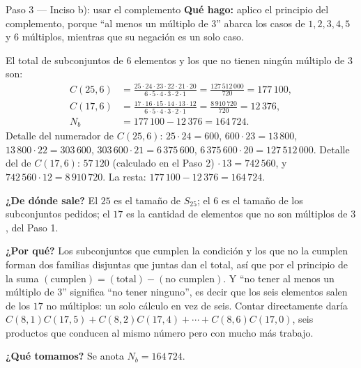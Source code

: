 \documentclass[11pt]{article}
\begin{document}
\begin{paso}{Paso 3 --- Inciso b): usar el complemento}
\textbf{Qué hago:} aplico el principio del complemento, porque ``al menos un múltiplo de 3'' abarca los casos de $1,2,3,4,5$ y $6$ múltiplos, mientras que su negación es un solo caso.

El total de subconjuntos de $6$ elementos y los que no tienen ningún múltiplo de $3$ son:
\begin{align*}
  C(25,6)&=\frac{25\cdot 24\cdot 23\cdot 22\cdot 21\cdot 20}{6\cdot 5\cdot 4\cdot 3\cdot 2\cdot 1}=\frac{127\,512\,000}{720}=177\,100,\\
  C(17,6)&=\frac{17\cdot 16\cdot 15\cdot 14\cdot 13\cdot 12}{6\cdot 5\cdot 4\cdot 3\cdot 2\cdot 1}=\frac{8\,910\,720}{720}=12\,376,\\
  N_b&=177\,100-12\,376=164\,724 .
\end{align*}
Detalle del numerador de $C(25,6)$: $25\cdot 24=600$, $600\cdot 23=13\,800$, $13\,800\cdot 22=303\,600$, $303\,600\cdot 21=6\,375\,600$, $6\,375\,600\cdot 20=127\,512\,000$. Detalle del de $C(17,6)$: $57\,120$ (calculado en el Paso 2) $\cdot\,13=742\,560$, y $742\,560\cdot 12=8\,910\,720$. La resta: $177\,100-12\,376=164\,724$.

\textbf{¿De dónde sale?} El $25$ es el tamaño de $S_{25}$; el $6$ es el tamaño de los subconjuntos pedidos; el $17$ es la cantidad de elementos que no son múltiplos de $3$, del Paso 1.

\textbf{¿Por qué?} Los subconjuntos que cumplen la condición y los que no la cumplen forman dos familias disjuntas que juntas dan el total, así que por el principio de la suma $(\text{cumplen})=(\text{total})-(\text{no cumplen})$. Y ``no tener al menos un múltiplo de $3$'' significa ``no tener ninguno'', es decir que los seis elementos salen de los $17$ no múltiplos: un solo cálculo en vez de seis. Contar directamente daría $C(8,1)C(17,5)+C(8,2)C(17,4)+\cdots+C(8,6)C(17,0)$, seis productos que conducen al mismo número pero con mucho más trabajo.

\textbf{¿Qué tomamos?} Se anota $N_b=164\,724$.
\end{paso}
\end{document}
